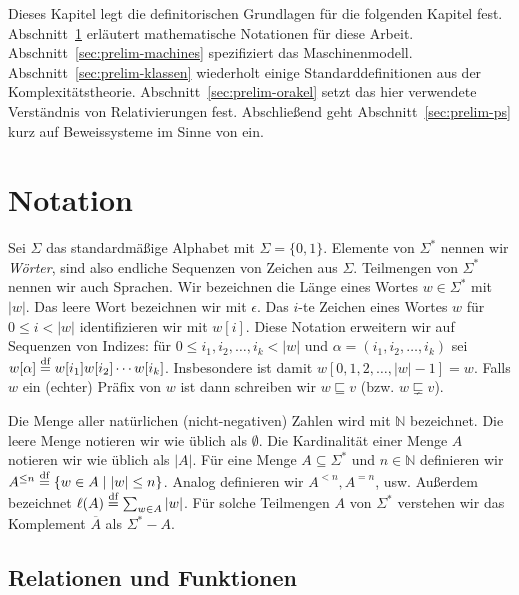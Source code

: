 Dieses Kapitel legt die definitorischen Grundlagen für die folgenden Kapitel fest. Abschnitt~\ref{sec:notation} erläutert mathematische Notationen für diese Arbeit. Abschnitt~\ref{sec:prelim-machines} spezifiziert das Maschinenmodell.  Abschnitt~\ref{sec:prelim-klassen} wiederholt einige Standarddefinitionen aus der Komplexitätstheorie. Abschnitt~\ref{sec:prelim-orakel} setzt das hier verwendete Verständnis von Relativierungen fest. Abschließend geht Abschnitt~\ref{sec:prelim-ps} kurz auf Beweissysteme im Sinne von \textcite{cook_relative_1979} ein.

\section{Notation}\label{sec:notation}

Sei $\Sigma$ das standardmäßige Alphabet mit $\Sigma=\{0,1\}$. Elemente von $\Sigma^*$ nennen wir \emph{Wörter}, sind also endliche Sequenzen von Zeichen aus $\Sigma$. Teilmengen von $\Sigma^*$ nennen wir auch Sprachen. Wir bezeichnen die Länge eines Wortes $w\in\Sigma^*$ mit $|w|$. Das leere Wort bezeichnen wir mit $\epsilon$. Das $i$-te Zeichen eines Wortes $w$ für $0\leq i< |w|$ identifizieren wir mit $w[i]$. Diese Notation erweitern wir auf Sequenzen von Indizes: für $0\leq i_1, i_2, \dots, i_k< |w|$ und $\alpha=(i_1, i_2, \dots, i_k)$ sei $w[\alpha] \stackrel{\text{df}}{=} w[i_1]w[i_2]\cdots w[i_k]$. Insbesondere ist damit $w[0,1,2,\dots, |w|-1]= w$.
Falls $w$ ein (echter) Präfix von $w$ ist dann schreiben wir $w \sqsubseteq v$ (bzw. $w\sqsubsetneq v$).

Die Menge aller natürlichen (nicht-negativen) Zahlen wird mit $\mathbb N$ bezeichnet. Die leere Menge notieren wir wie üblich als $\emptyset$. Die Kardinalität einer Menge $A$ notieren wir wie üblich als $|A|$. Für eine Menge $A\subseteq\Sigma^*$ und $n\in \mathbb N$ definieren wir $A^{\leq n} \stackrel{\text{df}}{=} \{ w\in A \mid |w|\leq n\}$. Analog definieren wir $A^{<n}, A^{=n}$, usw. Außerdem bezeichnet $\ell(A)\stackrel{\text{df}}{=}\sum_{w\in A} |w|$. Für solche Teilmengen $A$ von $\Sigma^*$ verstehen wir das Komplement $\overline{A}$ als $\Sigma^*-A$.

\subsection*{Relationen und Funktionen}

